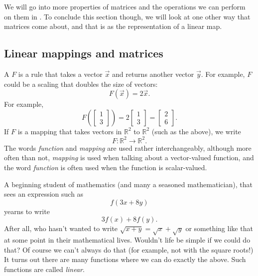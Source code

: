 We will go into more properties of matrices and the operations we can perform on them in . To conclude this section though, we will look at one other way that matrices come about, and that is as the representation of a linear map.

\subsection{Linear mappings and matrices}

A \emph{}
$F$ is a rule that takes a vector $\vec{x}$ and returns another vector
$\vec{y}$.  For example, $F$ could be a scaling that doubles the size of
vectors:
\begin{equation*}
F(\vec{x}) = 2 \vec{x} .
\end{equation*}
For example,
\begin{equation*}
F
\left( \begin{bmatrix} 1 \\ 3 \end{bmatrix} \right)
=
2
\begin{bmatrix} 1 \\ 3 \end{bmatrix}
=
\begin{bmatrix} 2 \\ 6 \end{bmatrix} .
\end{equation*}
If $F$ is a mapping that takes vectors in
${\mathbb R}^2$ to 
${\mathbb R}^2$ (such as the above), we write
\begin{equation*}
F \colon {\mathbb R}^2 \to {\mathbb R}^2 .
\end{equation*}
The words \emph{function} and \emph{mapping} are used rather interchangeably,
although more often than not, \emph{mapping} is used when talking about a
vector-valued function, and the word \emph{function} is often used when the
function is scalar-valued.

A beginning student of mathematics (and many a seasoned mathematician),
that
sees an expression such as
\begin{equation*}
f(3x+8y)
\end{equation*}
yearns to write
\begin{equation*}
3f(x)+8f(y) .
\end{equation*}
After all, who hasn't wanted to write $\sqrt{x+y} = \sqrt{x} + \sqrt{y}$ or
something like that at some point in their mathematical lives.
Wouldn't life be simple if we could do that?
Of course we can't always do that (for example, not with the square roots!)
It turns out there are many functions where
we can do exactly the above.  Such functions are called \emph{linear}.

